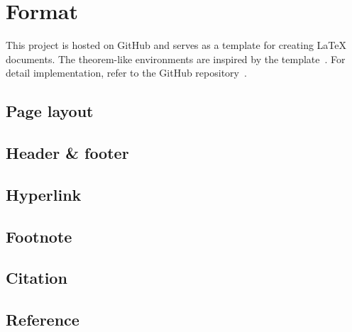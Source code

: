 \section{Format}

This project is hosted on GitHub and serves as a template for creating {\LaTeX} documents. 
The theorem-like environments are inspired by the template~\autocite{sleepymalc2022template}.
For detail implementation, refer to the GitHub repository~\autocite{chang2025document}.

\subsection{Page layout}

\subsection{Header \& footer}

\subsection{Hyperlink}

\subsection{Footnote}

\subsection{Citation}

\subsection{Reference}